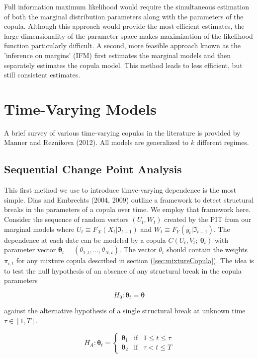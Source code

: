 \documentclass[12pt]{article}
\begin{document}
Full information maximum likelihood would require the simultaneous estimation of both the marginal distribution parameters along with the parameters of the copula. Although this approach would provide the most efficient estimates, the large dimensionality of the parameter space makes maximization of the likelihood function particularly difficult. A second, more feasible approach known as the 'inference on margins' (IFM) first estimates the marginal models and then separately estimates the copula model. This method leads to less efficient, but still consistent estimates.

\section{Time-Varying Models}

A brief survey of various time-varying copulas in the literature is provided by Manner and Reznikova (2012). All models are generalized to $k$ different regimes.

\subsection{Sequential Change Point Analysis}

This first method we use to introduce timve-varying dependence is the most simple. Dias and Embrechts (2004, 2009) outline a framework to detect structural breaks in the parameters of a copula over time. We employ that framework here. Consider the sequence of random vectors $\left(U_{t}, W_{t}\right)$ created by the PIT from our marginal models where $U_{t}\equiv F_{X}\left(X_{t}|\Im_{t-1}\right)$ and $W_{t}\equiv F_{Y}\left(y_{t} | \Im_{t-1}\right)$. The dependence at each date can be modeled by a copula $C\left(U_{t}, V_{t};~\boldsymbol{\theta}_{t}\right)$ with parameter vector $\boldsymbol{\theta}_{t}=(\theta_{1,t},...,\theta_{N,t})$. The vector $\theta_{t}$ should contain the weights $\pi _{i,t}$ for any mixture copula described in section (\ref{sec:mixtureCopula}). The idea is to test the null hypothesis of an absence of any structural break in the copula parameters

\begin{equation}
H_{0}:\boldsymbol{\theta}_{t} = \boldsymbol{\theta}
\end{equation}

against the alternative hypothesis of a single structural break at unknown time $\tau \in \left[1, T\right]$.

\begin{equation}
H_{A}:\boldsymbol{\theta}_{t} = \left\{
\begin{array}{ccc}
\boldsymbol{\theta}_{1} & \text{if} & 1\leq t \leq \tau \\ 
\boldsymbol{\theta}_{2} & \text{if} & \tau < t \leq T
\end{array}
\right. 
\end{equation}
\end{document}
